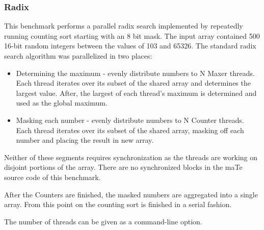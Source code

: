 \subsubsection{Radix}

This benchmark performs a parallel radix search implemented by
repeatedly running counting sort starting with an 8 bit mask.  The
input array contained 500 16-bit random integers between the values of
103 and 65326.  The standard radix search algorithm was parallelized
in two places:

\begin{itemize}
\item Determining the maximum - evenly distribute numbers to N Maxer
  threads.  Each thread iterates over its subset of the shared array
  and determines the largest value.  After, the largest of each
  thread's maximum is determined and used as the global maximum.

\item Masking each number - evenly distribute numbers to N Counter
  threads.  Each thread iterates over its subset of the shared array,
  masking off each number and placing the result in new array.
\end{itemize}

Neither of these segments requires synchronization as the threads are
working on disjoint portions of the array.  There are no synchronized
blocks in the maTe source code of this benchmark.

After the Counters are finished, the masked numbers are aggregated
into a single array.  From this point on the counting sort is finished
in a serial fashion.

The number of threads can be given as a command-line option.

